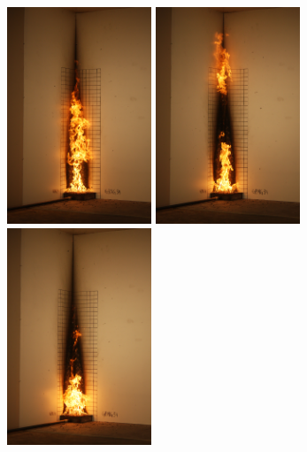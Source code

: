 \documentclass[twoside]{uocthesis}
\begin{document}
\begin{figure}[p]
	\includegraphics[width=1.7in]{../Figures/GBNG34_SequenceIMG_0990}
	\includegraphics[width=1.7in]{../Figures/GBNG34_SequenceIMG_0991}
	\includegraphics[width=1.7in]{../Figures/GBNG34_SequenceIMG_0992} \\


\end{figure}
\end{document}

